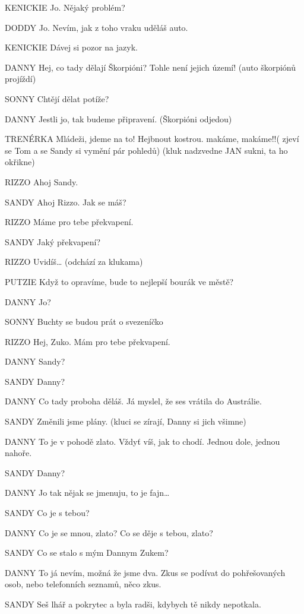 KENICKIE        Jo. Nějaký problém?

DODDY        Jo. Nevím, jak z toho vraku uděláš auto. 

KENICKIE        Dávej si pozor na jazyk.

DANNY        Hej, co tady dělají Škorpióni? Tohle není jejich území! (auto škorpiónů         projíždí)

SONNY          Chtějí dělat potíže?

DANNY         Jestli jo, tak budeme připravení. (Škorpióni odjedou)

TRENÉRKA        Mládeži, jdeme na to! Hejbnout kostrou. makáme, makáme!!( zjeví se Tom a se Sandy si vymění pár pohledů)  (kluk nadzvedne JAN sukni, ta ho okřikne)

RIZZO        Ahoj Sandy.

SANDY        Ahoj Rizzo. Jak se máš?

RIZZO        Máme pro tebe překvapení.

SANDY        Jaký překvapení?

RIZZO        Uvidíš…    (odchází za klukama)

PUTZIE        Když to opravíme, bude to nejlepší bourák ve městě?

DANNY        Jo?

SONNY        Buchty se budou prát o svezeníčko

RIZZO        Hej, Zuko. Mám pro tebe překvapení.

DANNY        Sandy?

SANDY        Danny?

DANNY        Co tady proboha děláš. Já myslel, že ses vrátila do Austrálie. 

SANDY        Změnili jsme plány. (kluci se zírají, Danny si jich všimne)

DANNY        To je v pohodě zlato. Vždyť víš, jak to chodí. Jednou dole, jednou nahoře. 

SANDY        Danny?

DANNY        Jo tak nějak se jmenuju, to je fajn…

SANDY        Co je s tebou?

DANNY        Co je se mnou, zlato? Co se děje s tebou, zlato?

SANDY        Co se stalo s mým Dannym Zukem?

DANNY        To já nevím, možná že jsme dva. Zkus se podívat do pohřešovaných                 osob, nebo telefonních seznamů, něco zkus.

SANDY        Seš lhář a pokrytec a byla radši, kdybych tě nikdy nepotkala.

